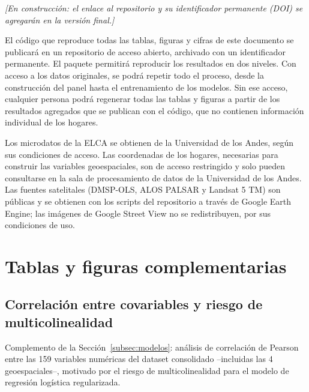 \documentclass[12pt, letterpaper]{article}
\begin{document}
\textit{[En construcción: el enlace al repositorio y su identificador
permanente (DOI) se agregarán en la versión final.]}

El código que reproduce todas las tablas, figuras y cifras de este
documento se publicará en un repositorio de acceso abierto, archivado con
un identificador permanente. El paquete permitirá reproducir los
resultados en dos niveles. Con acceso a los datos originales, se podrá
repetir todo el proceso, desde la construcción del panel hasta el
entrenamiento de los modelos. Sin ese acceso, cualquier persona podrá
regenerar todas las tablas y figuras a partir de los resultados agregados
que se publican con el código, que no contienen información individual de
los hogares.

Los microdatos de la ELCA se obtienen de la Universidad de los Andes,
según sus condiciones de acceso. Las coordenadas de los hogares,
necesarias para construir las variables geoespaciales, son de acceso
restringido y solo pueden consultarse en la sala de procesamiento de datos
de la Universidad de los Andes. Las fuentes satelitales (DMSP-OLS, ALOS
PALSAR y Landsat 5 TM) son públicas y se obtienen con los scripts del
repositorio a través de Google Earth Engine; las imágenes de Google Street
View no se redistribuyen, por sus condiciones de uso.

\newpage
\printbibliography[heading=bibintoc, title={Referencias}]

\newpage
\appendix
\renewcommand{\thesection}{\Alph{section}}

\section{Tablas y figuras complementarias}
\label{apx:tablas}


\subsection{Correlación entre covariables y riesgo de multicolinealidad}
\label{apx:correlacion}

Complemento de la Sección~\ref{subsec:modelos}: análisis de correlación de
Pearson entre las 159 variables numéricas del dataset consolidado
--incluidas las 4 geoespaciales--, motivado por el riesgo de
multicolinealidad para el modelo de regresión logística regularizada.
\end{document}
